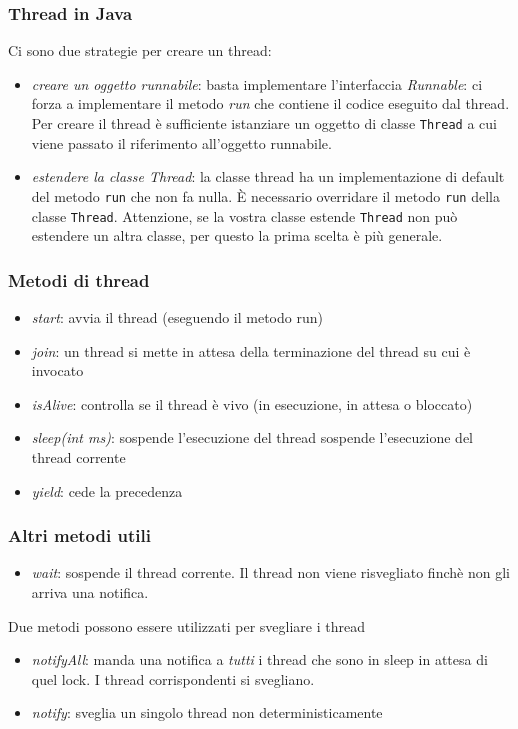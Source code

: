 \documentclass{beamer}
\begin{document}
\begin{frame}
\frametitle{Thread in Java}
Ci sono due strategie per creare un thread:
\begin{itemize}
\item \emph{creare un oggetto runnabile}: basta implementare l'interfaccia \emph{Runnable}: ci forza a implementare il metodo \emph{run} che contiene il codice eseguito dal thread.  Per creare il thread \`e sufficiente istanziare un oggetto di classe \texttt{Thread} a cui viene passato il riferimento all'oggetto runnabile. 
\item \emph{estendere la classe Thread}: la classe thread ha un implementazione di default del metodo \texttt{run} che non fa nulla. \`E necessario overridare il metodo \texttt{run} della classe \texttt{Thread}. Attenzione, se la vostra classe estende \texttt{Thread} non pu\`o estendere un altra classe, per questo la prima scelta \`e pi\`u generale.
\end{itemize}
\end{frame}

\begin{frame}
\frametitle{Metodi di thread}
\begin{itemize}
\item \emph{start}: avvia il thread (eseguendo il metodo run)
\item \emph{join}: un thread si mette in attesa della terminazione del thread su cui \`e invocato
\item \emph{isAlive}: controlla se il thread \`e vivo (in esecuzione, in attesa o bloccato)
\item \emph{sleep(int ms)}: sospende l’esecuzione del thread sospende l’esecuzione del thread corrente
\item \emph{yield}: cede la precedenza
\end{itemize}
\end{frame}

\begin{frame}
\frametitle{Altri metodi utili}
\begin{itemize}
\item \emph{wait}: sospende il thread corrente. Il thread non viene risvegliato finch\`e non gli arriva una notifica.
\end{itemize}
Due metodi possono essere utilizzati per svegliare i thread
\begin{itemize}
\item \emph{notifyAll}: manda una notifica a \emph{tutti} i thread che sono in sleep in attesa di quel lock. I thread corrispondenti si svegliano.
\item \emph{notify}: sveglia un singolo thread non deterministicamente
\end{itemize}
\end{frame}
\end{document}
